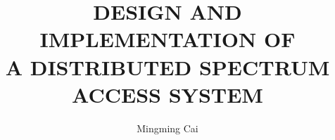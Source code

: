 \documentclass[final,numrefs,sort&compress,oneadvisor,noinfo]{nddiss2e}
\begin{document}
\frontmatter         %

\title{DESIGN AND IMPLEMENTATION OF\\ A DISTRIBUTED SPECTRUM ACCESS SYSTEM}
\author{Mingming Cai}           %

\maketitle           %





\makecopyright
\end{document}
